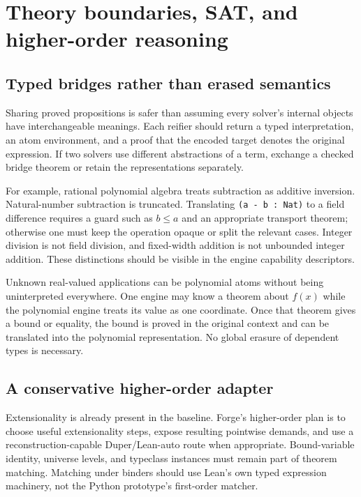 \documentclass[11pt,a4paper]{article}
\newcommand{\code}[1]{\texttt{#1}}
\begin{document}
\section{Theory boundaries, SAT, and higher-order reasoning}
\label{sec:boundaries}

\subsection{Typed bridges rather than erased semantics}
Sharing proved propositions is safer than assuming every solver's internal
objects have interchangeable meanings. Each reifier should return a typed
interpretation, an atom environment, and a proof that the encoded target denotes
the original expression. If two solvers use different abstractions of a term,
exchange a checked bridge theorem or retain the representations separately.

For example, rational polynomial algebra treats subtraction as additive
inversion. Natural-number subtraction is truncated. Translating
\code{(a - b : Nat)} to a field difference requires a guard such as $b\le a$
and an appropriate transport theorem; otherwise one must keep the operation
opaque or split the relevant cases. Integer division is not field division,
and fixed-width addition is not unbounded integer addition. These distinctions
should be visible in the engine capability descriptors.

Unknown real-valued applications can be polynomial atoms without being
uninterpreted everywhere. One engine may know a theorem about $f(x)$ while the
polynomial engine treats its value as one coordinate. Once that theorem gives
a bound or equality, the bound is proved in the original context and can be
translated into the polynomial representation. No global erasure of dependent
types is necessary.

\subsection{A conservative higher-order adapter}
Extensionality is already present in the baseline. Forge's higher-order plan
is to choose useful extensionality steps, expose resulting pointwise demands,
and use a reconstruction-capable Duper/Lean-auto route when appropriate.
Bound-variable identity, universe levels, and typeclass instances must remain
part of theorem matching. Matching under binders should use Lean's own typed
expression machinery, not the Python prototype's first-order matcher.
\end{document}
